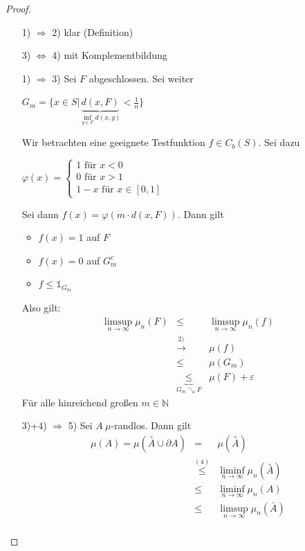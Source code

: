 \documentclass[10pt,a4paper]{report}
\newcommand{\N}{\mathbb{N}}
\numberwithin{equation}{section}
\numberwithin{figure}{section}
\theoremstyle{plain}
\theoremstyle{definition}
\theoremstyle{remark}
\theoremstyle{plain}
\newcommand{\1}{ \mathbb{1} } %
\begin{document}
\begin{proof} \ 
  \begin{itemize}
  \item[1) $\Rightarrow$ 2)] klar (Definition)
  \item[3) $\Leftrightarrow$ 4)] mit Komplementbildung
  \item[1) $\Rightarrow$ 3)] Sei $F$ abgeschlossen. Sei weiter
    \begin{center}
      $G_m=\{x \in S|\underbrace{d(x,F)}_{\inf\limits_{y \in
          F}d(x,y)}<\frac{1}{n}\}$
    \end{center}
    Wir betrachten eine geeignete Testfunktion $f \in C_b(S)$. Sei
    dazu
    \begin{center}
      $\varphi(x)=\begin{cases}
        1 \text{ für } x < 0\\
        0 \text{ für } x > 1\\
        1-x \text{ für } x \in [0,1]
      \end{cases}$
    \end{center}
    Sei dann $f(x)=\varphi(m\cdot d(x,F))$. Dann gilt
    \begin{itemize}
    \item $f(x)=1$ auf $F$
    \item $f(x)=0$ auf $G_m^c$
    \item $f \leq \1_{G_m}$
    \end{itemize}
    Also gilt:
    \begin{eqnarray*}
      \limsup\limits_{n \to \infty} \mu_n(F) &\leq & \limsup\limits_{n \to \infty} \mu_n(f)\\
      &\overset{2)}{\to }& \mu(f)\\
      &\leq & \mu(G_m)\\
      &\underbrace{\leq}_{G_m \searrow F}& \mu(F)+\varepsilon
    \end{eqnarray*}
    Für alle hinreichend großen $m \in \N$
  \item[3)+4) $\Rightarrow$ 5)] Sei $A ~ \mu$-randlos. Dann gilt
    \begin{eqnarray*}
      \mu(A)=\mu(\overset{\circ}{A}\cup \partial A)&=&\mu(\overset{\circ}{A})\\
      & \overset{(4)}{\leq}& \liminf\limits_{n \to \infty} \mu_n(\overset{\circ}{A})\\
      & \leq & \liminf\limits_{n \to \infty} \mu_n(A)\\
      & \leq & \limsup\limits_{n \to \infty} \mu_n(\bar{A})\\ 

\end{eqnarray*}
\end{itemize}
\end{proof}
\end{document}
